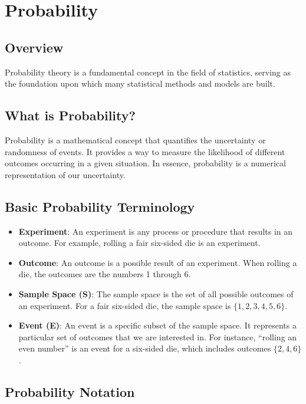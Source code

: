 \documentclass[
  a4paper,
]{scrbook}
\begin{document}
\section{Probability}\label{probability}

\subsection{Overview}\label{overview}

Probability theory is a fundamental concept in the field of statistics,
serving as the foundation upon which many statistical methods and models
are built.

\subsection{What is Probability?}\label{what-is-probability}

Probability is a mathematical concept that quantifies the uncertainty or
randomness of events. It provides a way to measure the likelihood of
different outcomes occurring in a given situation. In essence,
probability is a numerical representation of our uncertainty.

\subsection{Basic Probability
Terminology}\label{basic-probability-terminology}

\begin{itemize}
\item
  \textbf{Experiment}: An experiment is any process or procedure that
  results in an outcome. For example, rolling a fair six-sided die is an
  experiment.
\item
  \textbf{Outcome}: An outcome is a possible result of an experiment.
  When rolling a die, the outcomes are the numbers 1 through 6.
\item
  \textbf{Sample Space (S)}: The sample space is the set of all possible
  outcomes of an experiment. For a fair six-sided die, the sample space
  is \(\{1, 2, 3, 4, 5, 6\}\).
\item
  \textbf{Event (E)}: An event is a specific subset of the sample space.
  It represents a particular set of outcomes that we are interested in.
  For instance, ``rolling an even number'' is an event for a six-sided
  die, which includes outcomes \(\{2, 4, 6\}\).
\end{itemize}

\subsection{Probability Notation}\label{probability-notation}
\end{document}
